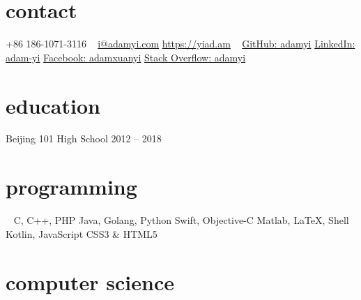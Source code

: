 \documentclass[hidelinks__VERSION__]{adamyi-cv}
\begin{document}



\begin{aside} %
\section{contact}
+86 186-1071-3116
~
\href{mailto:i@adamyi.com}{i@adamyi.com}
\href{https://yiad.am}{https://yiad.am}
~
\href{https://github.com/adamyi}{GitHub: adamyi}
\href{https://www.linkedin.com/in/adam-yi/}{LinkedIn: adam-yi}
\href{https://www.facebook.com/adamxuanyi}{Facebook: adamxuanyi}
\href{https://stackoverflow.com/users/6482303/adamyi}{Stack Overflow: adamyi}
\section{education}
Beijing 101 High School
2012 -- 2018
\section{programming}
~
C, C++, PHP
Java, Golang, Python
Swift, Objective-C
Matlab, \LaTeX, Shell
Kotlin, JavaScript
CSS3 \& HTML5
\versionsection
\end{aside}


\section{computer science}
\end{document}
